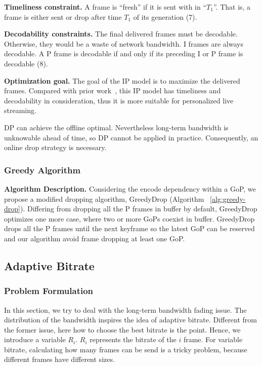 \textbf{Timeliness constraint.}
A frame is ``fresh'' if it is sent with in ``$T_1$''. That is, a frame is either sent or drop after time $T_1$ of its generation (7).

\textbf{Decodability constraints.} The final delivered frames must be decodable. Otherwise, they would be a waste of network bandwidth. I frames are always decodable. A P frame is decodable if and only if its preceding I or P frame is decodable (8).

\textbf{Optimization goal.} The goal of the IP model is to maximize the delivered frames.
Compared with prior work~\cite{singh2004dynamic}, this IP model has timeliness and decodability in consideration, thus it is more suitable for personalized live streaming.

DP can achieve the offline optimal. Nevertheless long-term bandwidth is unknowable ahead of time, so DP cannot be applied in practice. Consequently, an online drop strategy is necessary.

\subsubsection{Greedy Algorithm}

\textbf{Algorithm Description.} Considering the encode dependency within a GoP, we propose a modified dropping algorithm, GreedyDrop (Algorithm ~\ref{alg:greedy-drop}). Differing from dropping all the P frames in buffer by default, GreedyDrop optimizes one more case, where two or more GoPs coexist in buffer. GreedyDrop drops all the P frames until the next keyframe so the latest GoP can be reserved and our algorithm avoid frame dropping at least one GoP.

\subsection{Adaptive Bitrate}
\label{subsec:adaptive-bitrate}
\subsubsection{Problem Formulation}


In this section, we try to deal with the long-term bandwidth fading issue. The distribution of the bandwidth inspires the idea of adaptive bitrate. Different from the former issue, here how to choose the best bitrate is the point. Hence, we introduce a variable $R_{i}$. $R_{i}$ represents the bitrate of the $i$ frame. For variable bitrate, calculating how many frames can be send is a tricky problem, because different frames have different sizes.

